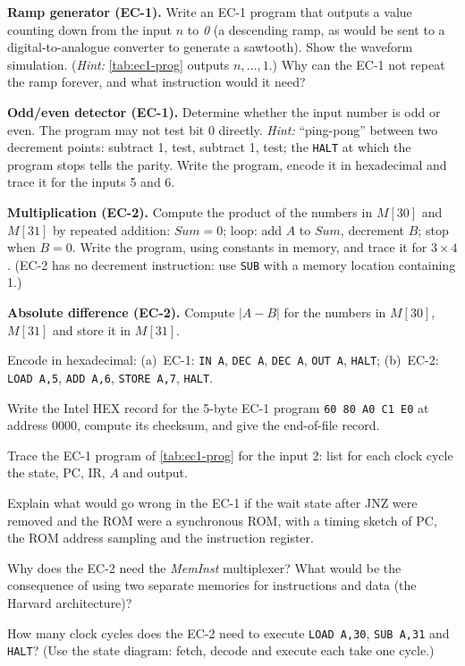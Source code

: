\begin{exlist}
  \item \textbf{Ramp generator (EC-1).} Write an EC-1 program that outputs a value counting down from the input $n$ to \emph{0} (a descending ramp, as would be sent to a digital-to-analogue converter to generate a sawtooth). Show the waveform simulation. (\emph{Hint:} \cref{tab:ec1-prog} outputs $n,\dots,1$.) Why can the EC-1 not repeat the ramp forever, and what instruction would it need?
  \item \textbf{Odd/even detector (EC-1).} Determine whether the input number is odd or even. The program may not test bit 0 directly. \emph{Hint:} ``ping-pong'' between two decrement points: subtract 1, test, subtract 1, test; the \texttt{HALT} at which the program stops tells the parity. Write the program, encode it in hexadecimal and trace it for the inputs 5 and 6.
  \item \textbf{Multiplication (EC-2).} Compute the product of the numbers in $M[30]$ and $M[31]$ by repeated addition: $Sum=0$; loop: add $A$ to $Sum$, decrement $B$; stop when $B=0$. Write the program, using constants in memory, and trace it for $3\times4$. (EC-2 has no decrement instruction: use \texttt{SUB} with a memory location containing 1.)
  \item \textbf{Absolute difference (EC-2).} Compute $|A-B|$ for the numbers in $M[30]$, $M[31]$ and store it in $M[31]$.
  \item Encode in hexadecimal: (a)~EC-1: \texttt{IN A}, \texttt{DEC A}, \texttt{DEC A}, \texttt{OUT A}, \texttt{HALT}; (b)~EC-2: \texttt{LOAD A,5}, \texttt{ADD A,6}, \texttt{STORE A,7}, \texttt{HALT}.
  \item Write the Intel HEX record for the 5-byte EC-1 program \texttt{60 80 A0 C1 E0} at address 0000, compute its checksum, and give the end-of-file record.
  \item Trace the EC-1 program of \cref{tab:ec1-prog} for the input 2: list for each clock cycle the state, PC, IR, $A$ and output.
  \item Explain what would go wrong in the EC-1 if the wait state after JNZ were removed and the ROM were a synchronous ROM, with a timing sketch of PC, the ROM address sampling and the instruction register.
  \item Why does the EC-2 need the \textit{MemInst} multiplexer? What would be the consequence of using two separate memories for instructions and data (the Harvard architecture)?
  \item How many clock cycles does the EC-2 need to execute \texttt{LOAD A,30}, \texttt{SUB A,31} and \texttt{HALT}? (Use the state diagram: fetch, decode and execute each take one cycle.)

\end{exlist}
